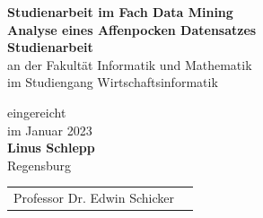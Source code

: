     \begin{center}
        \vspace*{4cm} %
        \Large
	    \textbf{Studienarbeit im Fach Data Mining}\\ %
        \large
        \textbf{Analyse eines Affenpocken Datensatzes}\\ %

        \vspace*{2cm} %
        \textbf{Studienarbeit}\\ %
        \vspace*{1cm}
    \large
        an der Fakultät Informatik und Mathematik\\
        im Studiengang Wirtschaftsinformatik
    \\ %
    
    \vspace*{2cm} 
    \normalsize
        \begin{center}
            eingereicht\\
            im Januar 2023\\
        \textbf{Linus Schlepp}\\
        Regensburg
            
            
        \end{center}
        \vspace*{2cm}      
        \begin{table}[H]
            \centering
            \begin{tabular}{ll}
                Professor Dr. Edwin Schicker \\
              
            \end{tabular}%
        \end{table}%
        
        
        
    \end{center}
    
\pagebreak
